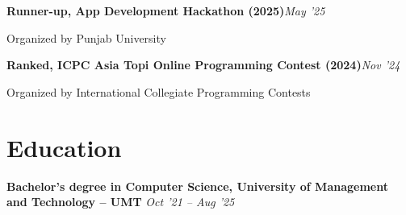 \documentclass[10pt, letterpaper]{article}
\newcommand{\awardrow}[3]{%
\noindent\textbf{#1}\hfill{\small\color{lightgray}\textit{#3}}\par
{\small\color{lightgray}#2}\par\vspace{4pt}}
\begin{document}
\awardrow{Runner-up, App Development Hackathon (2025)}{Organized by Punjab University}{May '25}
\awardrow{Ranked, ICPC Asia Topi Online Programming Contest (2024)}{Organized by International Collegiate Programming Contests}{Nov '24}

\section{Education}

\noindent\textbf{Bachelor's degree in Computer Science, University of Management and Technology -- UMT}
\hfill{\small\color{lightgray}\textit{Oct '21 -- Aug '25}}
\end{document}
